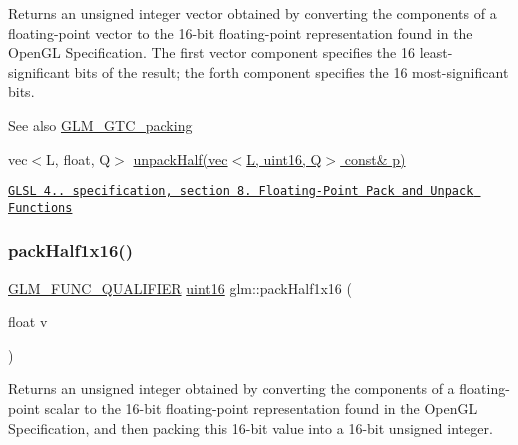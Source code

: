 Returns an unsigned integer vector obtained by converting the components of a floating-\/point vector to the 16-\/bit floating-\/point representation found in the Open\+GL Specification. The first vector component specifies the 16 least-\/significant bits of the result; the forth component specifies the 16 most-\/significant bits.

\begin{DoxySeeAlso}{See also}
\hyperlink{group__gtc__packing}{G\+L\+M\+\_\+\+G\+T\+C\+\_\+packing} 

vec$<$\+L, float, Q$>$ \hyperlink{group__gtc__packing_ga30d6b2f1806315bcd6047131f547d33b}{unpack\+Half(vec$<$\+L, uint16, Q$>$ const\& p)} 

\href{http://www.opengl.org/registry/doc/GLSLangSpec.4.20.8.pdf}{\tt G\+L\+SL 4.. specification, section 8. Floating-\/\+Point Pack and Unpack Functions} 
\end{DoxySeeAlso}
\mbox{\label{group__gtc__packing_gaba534b320836a35372e00af5771dd1a2}} 
\subsubsection{\texorpdfstring{pack\+Half1x16()}{packHalf1x16()}}
{\footnotesize\ttfamily \hyperlink{setup_8hpp_a33fdea6f91c5f834105f7415e2a64407}{G\+L\+M\+\_\+\+F\+U\+N\+C\+\_\+\+Q\+U\+A\+L\+I\+F\+I\+ER} \hyperlink{group__gtc__type__precision_gad8c2939e1fdd8e5828b31d95c52255d5}{uint16} glm\+::pack\+Half1x16 (\begin{DoxyParamCaption}\item[{float}]{v }\end{DoxyParamCaption})}

Returns an unsigned integer obtained by converting the components of a floating-\/point scalar to the 16-\/bit floating-\/point representation found in the Open\+GL Specification, and then packing this 16-\/bit value into a 16-\/bit unsigned integer.

